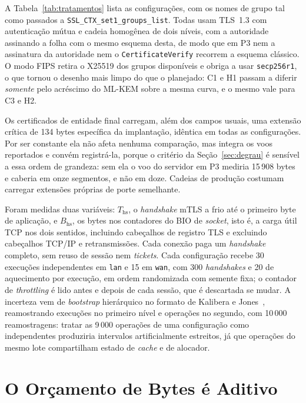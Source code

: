 \documentclass[conference]{IEEEtran}
\begin{document}
A Tabela~\ref{tab:tratamentos} lista as configurações, com os nomes de grupo tal
como passados a \texttt{SSL\_CTX\_set1\_groups\_list}. Todas usam TLS~1.3 com
autenticação mútua e cadeia homogênea de dois níveis, com a autoridade assinando
a folha com o mesmo esquema desta, de modo que em P3 nem a assinatura da
autoridade nem o \texttt{CertificateVerify} recorrem a esquema clássico. O modo
FIPS retira o X25519 dos grupos disponíveis e obriga a usar \texttt{secp256r1}, o
que tornou o desenho mais limpo do que o planejado: C1 e H1 passam a diferir
\emph{somente} pelo acréscimo do ML-KEM sobre a mesma curva, e o mesmo vale para
C3 e H2.

Os certificados de entidade final carregam, além dos campos usuais, uma extensão
crítica de 134 bytes específica da implantação, idêntica em todas as
configurações. Por ser constante ela não afeta nenhuma comparação, mas integra os
voos reportados e convém registrá-la, porque o critério da
Seção~\ref{sec:degrau} é sensível a essa ordem de grandeza: sem ela o voo do
servidor em P3 mediria 15\,908 bytes e caberia em onze segmentos, e não em doze.
Cadeias de produção costumam carregar extensões próprias de porte semelhante.

Foram medidas duas variáveis: $T_{\mathrm{hs}}$, o \textit{handshake} mTLS a frio
até o primeiro byte de aplicação, e $B_{\mathrm{hs}}$, os bytes nos contadores do
BIO de \textit{socket}, isto é, a carga útil TCP nos dois sentidos, incluindo
cabeçalhos de registro TLS e excluindo cabeçalhos TCP/IP e retransmissões. Cada
conexão paga um \textit{handshake} completo, sem reuso de sessão nem
\textit{tickets}. Cada configuração recebe 30 execuções independentes em
\texttt{lan} e 15 em \texttt{wan}, com 300 \textit{handshakes} e 20 de aquecimento
por execução, em ordem randomizada com semente fixa; o contador de
\textit{throttling} é lido antes e depois de cada sessão, que é descartada se
mudar. A incerteza vem de \textit{bootstrap} hierárquico no formato de Kalibera e
Jones~\cite{kalibera2013rigorous}, reamostrando execuções no primeiro nível e
operações no segundo, com 10\,000 reamostragens: tratar as 9\,000 operações de uma
configuração como independentes produziria intervalos artificialmente estreitos,
já que operações do mesmo lote compartilham estado de \textit{cache} e de
alocador.

\section{O Orçamento de Bytes é Aditivo}
\label{sec:bytes}
\end{document}
